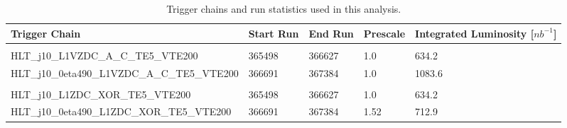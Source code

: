 
 
   \begin{table}[h]
  \centering
  \begin{tabular}{l P{1cm} P{1cm} P{1.5cm} P{2cm} }
  \toprule
  \textbf{Trigger Chain} & \textbf{Start Run} & \textbf{End Run} & \textbf{Prescale} & \textbf{Integrated Luminosity [$nb^{-1}$]} \\
   \hline
    \\
   \hline
   HLT\_j10\_L1VZDC\_A\_C\_TE5\_VTE200 & 365498 & 366627 & 1.0 & 634.2 \\
   \hline
   HLT\_j10\_0eta490\_L1VZDC\_A\_C\_TE5\_VTE200 & 366691 & 367384 & 1.0 & 1083.6 \\
   \hline
    \\
   \hline
  HLT\_j10\_L1ZDC\_XOR\_TE5\_VTE200 & 365498 & 366627 & 1.0 & 634.2 \\
  \hline
  HLT\_j10\_0eta490\_L1ZDC\_XOR\_TE5\_VTE200 & 366691 & 367384 & 1.52 & 712.9 \\
  \bottomrule
  \end{tabular}
    \caption{Trigger chains and run statistics used in this analysis.}
  \end{table}




